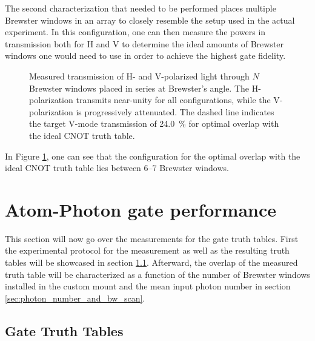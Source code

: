 The second characterization that needed to be performed places multiple Brewster windows in an array to closely resemble the setup used in the actual experiment. In this configuration, one can then measure the powers in transmission both for H and V to determine the ideal amounts of Brewster windows one would need to use in order to achieve the highest gate fidelity.

\begin{figure}[htbp]
	\centering
	
	\caption{Measured transmission of H- and V-polarized light through $N$ Brewster windows placed in series at Brewster's angle. The H-polarization transmits near-unity for all configurations, while the V-polarization is progressively attenuated. The dashed line indicates the target V-mode transmission of \SI{24.0}{\percent} for optimal overlap with the ideal CNOT truth table.}
	\label{fig:bw_multiple}
\end{figure}

In Figure \ref{fig:bw_multiple}, one can see that the configuration for the optimal overlap with the ideal CNOT truth table lies between 6--7 Brewster windows.

\section{Atom-Photon gate performance} \label{sec:ap_gate}

This section will now go over the measurements for the gate truth tables. First the experimental protocol for the measurement as well as the resulting truth tables will be showcased in section \ref{sec:truth_tables}. Afterward, the overlap of the measured truth table will be characterized as a function of the number of Brewster windows installed in the custom mount and the mean input photon number in section \ref{sec:photon_number_and_bw_scan}.

\subsection{Gate Truth Tables} \label{sec:truth_tables}

